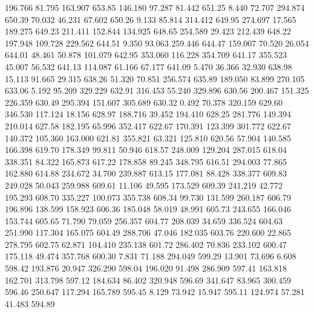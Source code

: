  196.766   81.795  163.907       653.85
 146.180   97.287   81.442       651.25
   8.440   72.707  294.874       650.39
  70.032   46.231   67.602       650.26
   9.133   85.814  314.412       649.95
 274.697   17.565  189.275       649.23
 211.411  152.844  134.925       648.65
 254.589   29.423  212.439       648.22
 197.948  109.728  229.562       644.51
   9.350   93.063  259.446       644.47
 159.007   70.520   26.054       644.01
  48.461   50.878  101.079       642.95
 353.060  116.228  354.709       641.17
 355.523   45.007   56.532       641.13
 114.087   61.166   67.177       641.09
   5.470   36.366   32.930       638.98
  15.113   91.665   29.315       638.26
  51.320   70.851  256.574       635.89
 189.050   83.899  270.105       633.06
   5.192   95.209  329.229       632.91
 316.453   55.240  329.896       630.56
 200.467  151.325  226.359       630.49
 295.394  151.607  305.689       630.32
   0.492   70.378  320.159       629.60
 346.530  117.124   18.156       628.97
 188.716   39.452  194.410       628.25
 281.776  149.394  210.014       627.58
 182.195   65.996  352.417       622.67
 170.391  123.399  301.772       622.67
 140.372  105.360  163.000       621.81
 355.821   63.321  125.810       620.56
  57.904  140.585  166.398       619.70
 178.349   99.811   50.946       618.57
 248.009  129.204  287.015       618.04
 338.351   84.322  165.873       617.22
 178.858   89.245  348.795       616.51
 294.003   77.865  162.880       614.88
 234.672   34.700  239.887       613.15
 177.081   88.428  338.377       609.83
 249.028   50.043  259.988       609.61
  11.106   49.595  173.529       609.39
 241.219   42.772  195.293       608.70
 335.227  100.073  355.738       608.34
  99.730  131.599  260.187       606.79
 196.896  138.599  158.923       606.36
 185.048   58.019   48.991       605.73
 243.655  166.046  153.744       605.65
  71.790   79.059  256.357       604.77
 208.039   34.659  336.524       604.63
 251.990  117.304  165.075       604.49
 288.706   47.046  182.035       603.76
 220.600   22.865  278.795       602.75
  62.871  104.410  235.138       601.72
 286.402   70.836  233.102       600.47
 175.118   49.474  357.768       600.30
   7.831   71.188  294.049       599.29
  13.901   73.696    6.608       598.42
 193.876   20.947  326.290       598.04
 196.020   91.498  286.909       597.41
 163.818  162.701  313.798       597.12
 184.634   86.402  320.948       596.69
 341.647   83.965  300.459       596.46
 250.647  117.294  165.789       595.45
   8.129   73.942   15.947       595.11
 124.974   57.281   41.483       594.89
